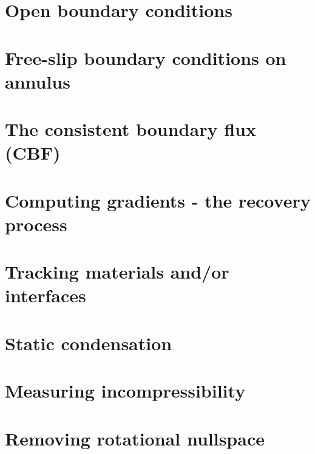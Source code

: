 \section{Open boundary conditions}\label{ss:openbc} %
\newpage %
\section{Free-slip boundary conditions on annulus}\label{ss:fsbc_annulus} %
\newpage %
\section{The consistent boundary flux (CBF) \label{ss:cbf}}  %
\newpage %
\section{Computing gradients - the recovery process \label{ss:gradrecovery}}  %
\newpage %
\section{Tracking materials and/or interfaces}  %
\newpage %
\section{Static condensation}  %
\newpage %
\section{Measuring incompressibility \label{ss_incomp}}  %
\newpage %
\section{Removing rotational nullspace\label{ss_nullspace}}  %
\newpage %
